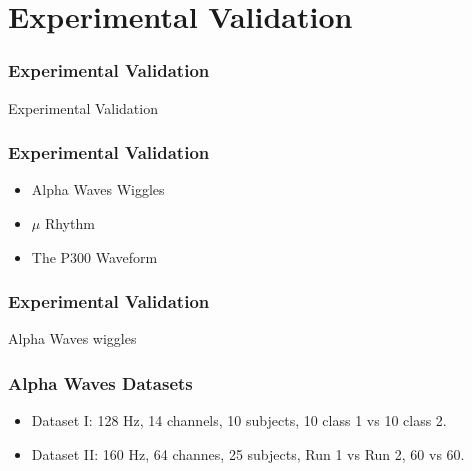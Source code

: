 \documentclass[aspectratio=169]{beamer}
\begin{document}
\section{Experimental Validation}
\begin{frame}
\frametitle{Experimental Validation}
\begin{center}
\LARGE Experimental Validation
\end{center}
\end{frame}

\begin{frame}
\frametitle{Experimental Validation}
\begin{center}
\begin{itemize}
 \item<1-> Alpha Waves Wiggles
 \item<2-> $\mu$ Rhythm
 \item<3-> The P300 Waveform
\end{itemize}
\end{center}
\end{frame}     

\begin{frame}
\frametitle{Experimental Validation}
\begin{center}
\LARGE Alpha Waves wiggles
\end{center}
\end{frame}

\begin{frame}
\frametitle{Alpha Waves Datasets}
\begin{center}
\begin{itemize}
\item Dataset I: 128 Hz, 14 channels, 10 subjects, 10 class 1 vs 10 class 2.
\item Dataset II: 160 Hz, 64 channes, 25 subjects, Run 1 vs Run 2, 60 vs 60.
\end{itemize}
\end{center}
\end{frame}
\end{document}
